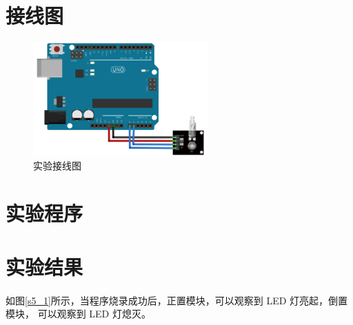 \documentclass[UTF8, oneside]{ctexbook}
\begin{document}
\section{接线图}
\begin{figure}[h]
    \centering
    \includegraphics[width=0.6\textwidth]{./result/sensor/5/lines.png}
    \caption{实验接线图}
    \label{s5_line}
\end{figure}

\section{实验程序}


\section{实验结果}
\paragraph{}
如图\ref{s5_1}所示，当程序烧录成功后，正置模块，可以观察到 LED 灯亮起，倒置模块，
可以观察到 LED 灯熄灭。
\end{document}

